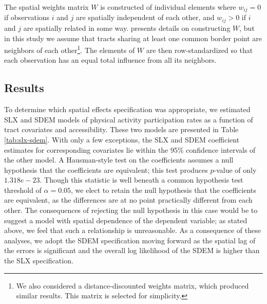 \documentclass[shortAfour,sageh.bst]{sagej}
\begin{document}
The spatial weights matrix \(W\) is constructed of individual elements
where \(w_{ij} = 0\) if observations \(i\) and \(j\) are spatially
independent of each other, and \(w_{ij} > 0\) if \(i\) and \(j\) are
spatially related in some way. \citet{Dubin1998} presents details on
constructing \(W\), but in this study we assume that tracts sharing at
least one common border point are neighbors of each other\footnote{We
  also considered a distance-discounted weights matrix, which produced
  similar results. This matrix is selected for simplicity.}. The
elements of \(W\) are then row-standardized so that each observation has
an equal total influence from all its neighbors.

\hypertarget{results}{%
\subsection{Results}\label{results}}

To determine which spatial effects specification was appropriate, we
estimated SLX and SDEM models of physical activity participation rates
as a function of tract covariates and accessibility. These two models
are presented in Table \ref{tab:slx-sdem}. With only a few exceptions,
the SLX and SDEM coefficient estimates for corresponding covariates lie
within the 95\% confidence intervals of the other model. A Hausman-style
test \citep{Pace2008} on the coefficients assumes a null hypothesis that
the coefficients are equivalent; this test produces \(p\)-value of only
\(1.318e-23\). Though this statistic is well beneath a common hypothesis
test threshold of \(\alpha = 0.05\), we elect to retain the null
hypothesis that the coefficients are equivalent, as the differences are
at no point practically different from each other. The consequences of
rejecting the null hypothesis in this case would be to suggest a model
with spatial dependence of the dependent variable; as stated above, we
feel that such a relationship is unreasonable. As a consequence of these
analyses, we adopt the SDEM specification moving forward as the spatial
lag of the errors is significant and the overall log likelihood of the
SDEM is higher than the SLX specification.
\end{document}
